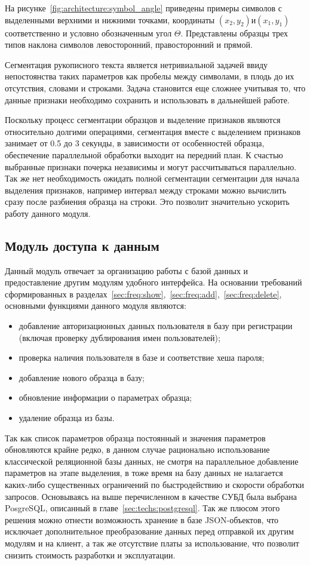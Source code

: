На рисунке~\ref{fig:architecture:symbol_angle} приведены примеры символов с выделенными верхними и нижними точками, координаты $ (x_2, y_2) и (x_1, y_1) $ соответственно и условно обозначенным угол $ \Theta $. Представлены образцы трех типов наклона символов левосторонний, правосторонний и прямой.

Сегментация рукописного текста является нетривиальной задачей ввиду непостоянства таких параметров как пробелы между символами, в плодь до их отсутствия, словами и строками. Задача становится еще сложнее учитывая то, что данные признаки необходимо сохранить и использовать в дальнейшей работе.

Поскольку процесс сегментации образцов и выделение признаков являются относительно долгими операциями, сегментация вместе с выделением признаков занимает от 0.5 до 3 секунды, в зависимости от особенностей образца, обеспечение параллельной обработки выходит на передний план. К счастью выбранные признаки почерка независимы и могут рассчитываться параллельно. Так же нет необходимость ожидать полной сегментации сегментации для начала выделения признаков, например интервал между строками можно вычислить сразу после разбиения образца на строки. Это позволит значительно ускорить работу данного модуля.

\subsection{Модуль доступа к данным}
Данный модуль отвечает за организацию работы с базой данных и предоставление другим модулям удобного интерфейса.
На основании требований сформированных в разделах~\ref{sec:freq:show},~\ref{sec:freq:add},~\ref{sec:freq:delete}, основными функциями данного модуля являются:
\begin{itemize}
  \item добавление авторизационных данных пользователя в базу при регистрации (включая проверку дублирования имен пользователей);
  \item проверка наличия пользователя в базе и соответствие хеша пароля;
  \item добавление нового образца в базу;
  \item обновление информации о параметрах образца;
  \item удаление образца из базы.
\end{itemize}

Так как список параметров образца постоянный и значения параметров обновляются крайне редко, в данном случае рационально использование классической реляционной базы данных, не смотря на параллельное добавление параметров на этапе выделения, в тоже время на базу данных не налагается каких-либо существенных ограничений по быстродействию и скорости обработки запросов. Основываясь на выше перечисленном в качестве СУБД была выбрана PosgreSQL, описанный в главе~\ref{sec:techs:postgresql}.
Так же плюсом этого решения можно отнести возможность хранение в базе JSON-объектов, что исключает дополнительное преобразование данных перед отправкой их другим модулям и на клиент, а так же отсутствие платы за использование, что позволит снизить стоимость разработки и эксплуатации.

